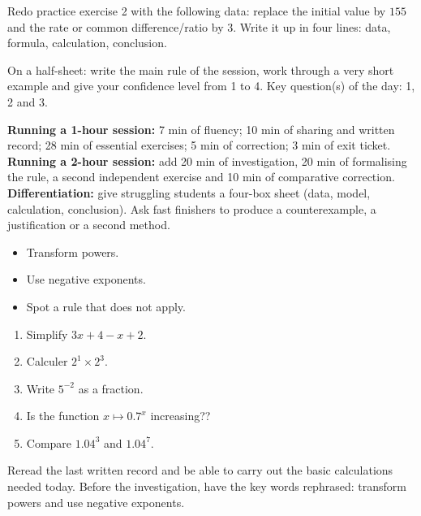 
\begin{dm}Redo practice exercise 2 with the following data: replace the initial value by $155$ and the rate or common difference/ratio by $3$. Write it up in four lines: data, formula, calculation, conclusion.\end{dm}

\begin{sortie}On a half-sheet: write the main rule of the session, work through a very short example and give your confidence level from 1 to 4. Key question(s) of the day: 1, 2 and 3.\end{sortie}

\ifprof
\begin{methode}
\textbf{Running a 1-hour session:} 7 min of fluency; 10 min of sharing and written record; 28 min of essential exercises; 5 min of correction; 3 min of exit ticket.\\
\textbf{Running a 2-hour session:} add 20 min of investigation, 20 min of formalising the rule, a second independent exercise and 10 min of comparative correction.\\
\textbf{Differentiation:} give struggling students a four-box sheet (data, model, calculation, conclusion). Ask fast finishers to produce a counterexample, a justification or a second method.
\end{methode}
\fi
{}
\begin{objectifs}\begin{itemize}\item Transform powers.\item Use negative exponents.\item Spot a rule that does not apply.\end{itemize}\end{objectifs}
\begin{automatismes}\begin{enumerate}\item Simplify $3x+4-x+2$. \item Calculer $2^1\times2^3$. \item Write $5^{-2}$ as a fraction. \item Is the function $x\mapsto0.7^x$ increasing?? \item Compare $1.04^3$ and $1.04^7$. \end{enumerate}\end{automatismes}
\begin{prerequis}Reread the last written record and be able to carry out the basic calculations needed today. Before the investigation, have the key words rephrased: transform powers and use negative exponents.\end{prerequis}

